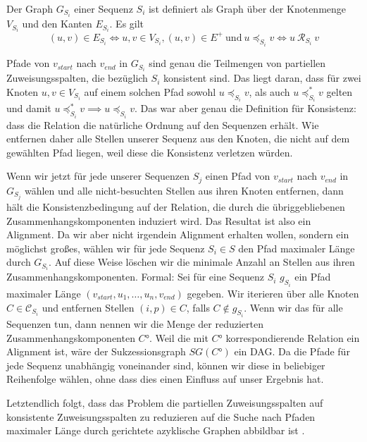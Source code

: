 \begin{definition}
	Der Graph $G_{S_i}$ einer Sequenz $S_i$ ist definiert als Graph über der Knotenmenge $V_{S_i}$ und den Kanten $E_{S_i}$. Es gilt
	\begin{equation}
		(u,v) \in E_{S_i} \Longleftrightarrow u,v \in V_{S_i}, (u,v) \in E^{+}\: \text{und}\: u \preceq_{S_i} v \Longleftrightarrow u\: \mathcal{R}_{S_i}\: v
	\end{equation}
\end{definition}

Pfade von $v_{start}$ nach $v_{end}$ in $G_{S_i}$ sind genau die Teilmengen von partiellen Zuweisungsspalten, die bezüglich $S_i$ konsistent sind. Das liegt daran, dass für zwei Knoten $u,v \in V_{S_i}$ auf einem solchen Pfad sowohl $u \preceq_{S_i} v$, als auch $u \preceq_{S_i}^{*} v$ gelten und damit $u \preceq_{S_i}^{*} v \implies u \preceq_{S_i} v$. Das war aber genau die Definition für Konsistenz: dass die Relation die natürliche Ordnung auf den Sequenzen erhält. Wie entfernen daher alle Stellen unserer Sequenz aus den Knoten, die nicht auf dem gewählten Pfad liegen, weil diese die Konsistenz verletzen würden.

Wenn wir jetzt für jede unserer Sequenzen $S_j$ einen Pfad von $v_{start}$ nach $v_{end}$ in $G_{S_j}$ wählen und alle nicht-besuchten Stellen  aus ihren Knoten entfernen, dann hält die Konsistenzbedingung auf der Relation, die durch die übriggebliebenen Zusammenhangskomponenten induziert wird. Das Resultat ist also ein Alignment. Da wir aber nicht irgendein Alignment erhalten wollen, sondern ein möglichst großes, wählen wir für jede Sequenz $S_i \in S$ den Pfad maximaler Länge durch $G_{S_i}$. Auf diese Weise löschen wir die minimale Anzahl an Stellen aus ihren Zusammenhangskomponenten. Formal: Sei für eine Sequenz $S_i$ $g_{S_i}$ ein Pfad maximaler Länge $(v_{start}, u_1, \dots, u_n, v_{end})$ gegeben. Wir iterieren über alle Knoten $C \in \mathcal{C}_{S_i}$ und entfernen Stellen $(i,p) \in C$, falls $C \notin g_{S_i}$. Wenn wir das für alle Sequenzen tun, dann nennen wir die Menge der reduzierten Zusammenhangskomponenten $C°$. Weil die mit $C°$ korrespondierende Relation ein Alignment ist, wäre der Sukzessionsgraph $SG(C°)$ ein DAG. Da die Pfade für jede Sequenz unabhängig voneinander sind, können wir diese in beliebiger Reihenfolge wählen, ohne dass dies einen Einfluss auf unser Ergebnis hat.

Letztendlich folgt, dass das Problem die partiellen Zuweisungsspalten auf konsistente Zuweisungsspalten zu reduzieren auf die Suche nach Pfaden maximaler Länge durch gerichtete azyklische Graphen abbildbar ist \cite{cpm10}.


